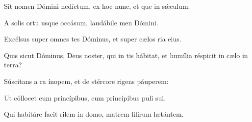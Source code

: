 \item {}

\item Sit nomen Dómini nedíctum,\psstar{} ex hoc nunc, et que in sǽculum.

\item A solis ortu usque  occásum,\psstar{} laudábile men Dómini.

\item Excélsus super omnes tes Dóminus,\psstar{} et super cælos ria eius.

\item Quis sicut Dóminus, Deus noster, qui in tis hábitat,\psstar{} et humília réspicit in cælo  in terra?

\item Súscitans a ra ínopem,\psstar{} et de stércore rigens páuperem:

\item Ut cóllocet eum  princípibus,\psstar{} cum princípibus puli sui.

\item Qui habitáre facit rilem in domo,\psstar{} matrem filirum lætántem.